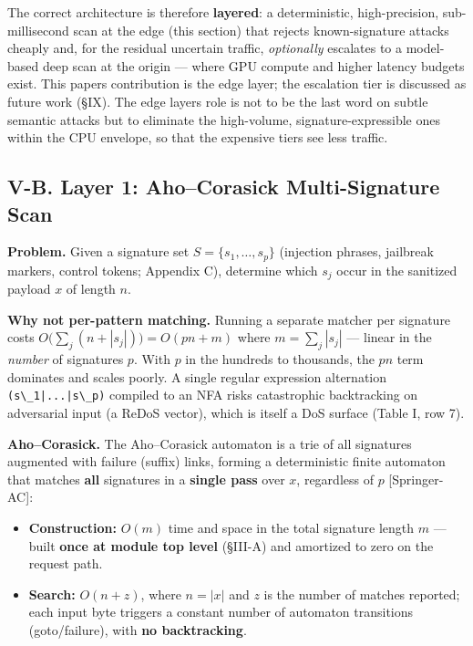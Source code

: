 The correct architecture is therefore \textbf{layered}: a deterministic,
high-precision, sub-millisecond scan at the edge (this section) that
rejects known-signature attacks cheaply and, for the residual uncertain
traffic, \emph{optionally} escalates to a model-based deep scan at the
origin --- where GPU compute and higher latency budgets exist. This
paper\textquotesingle s contribution is the edge layer; the escalation
tier is discussed as future work (§IX). The edge layer\textquotesingle s
role is not to be the last word on subtle semantic attacks but to
eliminate the high-volume, signature-expressible ones within the CPU
envelope, so that the expensive tiers see less traffic.

\subsection{V-B. Layer 1: Aho--Corasick Multi-Signature
Scan}\label{v-b-layer-1-ahocorasick-multi-signature-scan}

\textbf{Problem.} Given a signature set \(S=\{s_1,\dots,s_p\}\)
(injection phrases, jailbreak markers, control tokens; Appendix C),
determine which \(s_j\) occur in the sanitized payload \(x\) of length
\(n\).

\textbf{Why not per-pattern matching.} Running a separate matcher per
signature costs \(O\!\big(\sum_j (n+|s_j|)\big)=O(pn+m)\) where
\(m=\sum_j|s_j|\) --- linear in the \emph{number} of signatures \(p\).
With \(p\) in the hundreds to thousands, the \(pn\) term dominates and
scales poorly. A single regular expression alternation
\passthrough{\lstinline!(s\_1|...|s\_p)!} compiled to an NFA risks
catastrophic backtracking on adversarial input (a ReDoS vector), which
is itself a DoS surface (Table I, row 7).

\textbf{Aho--Corasick.} The Aho--Corasick automaton is a trie of all
signatures augmented with failure (suffix) links, forming a
deterministic finite automaton that matches \textbf{all} signatures in a
\textbf{single pass} over \(x\), regardless of \(p\) {[}Springer-AC{]}:

\begin{itemize}
\tightlist
\item
  \textbf{Construction:} \(O(m)\) time and space in the total signature
  length \(m\) --- built \textbf{once at module top level} (§III-A) and
  amortized to zero on the request path.
\item
  \textbf{Search:} \(O(n+z)\), where \(n=|x|\) and \(z\) is the number
  of matches reported; each input byte triggers a constant number of
  automaton transitions (goto/failure), with \textbf{no backtracking}.
\end{itemize}

